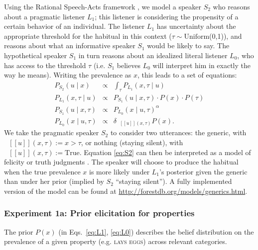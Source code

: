 \documentclass[11pt,letterpaper]{article}
\newcommand{\denote}[1]{\mbox{ $[\![ #1 ]\!]$}}
\begin{document}
Using the Rational Speech-Acts framework \cite{Frank2012,Goodman2013}, 
we model a speaker $S_2$ who reasons about a pragmatic listener $L_1$; this listener is considering the propensity of a certain behavior of an individual.
The listener $L_1$ has uncertainty about the appropriate threshold for the habitual in this context ($\tau \sim \text{Uniform}$(0,1)), and reasons about what an informative speaker $S_1$ would be likely to say. The hypothetical speaker $S_1$ in turn reasons about an idealized literal listener $L_0$, who has access to the threshold $\tau$ (i.e. $S_1$ believes $L_0$ will interpret him in exactly the way he means). 
Writing the prevalence as $x$, this leads to a set of equations:
\begin{eqnarray}
P_{S_{2}}(u \mid x) & \propto &  \int_{\tau} P_{L_{1}}(x , \tau \mid u) \label{eq:S2}\\
P_{L_{1}}(x , \tau \mid u) &\propto& P_{S_{1}}(u \mid x, \tau) \cdot P(x) \cdot P(\tau) \label{eq:L1}\\
P_{S_{1}}(u \mid x, \tau) &\propto&  {P_{L_{0}}(x \mid u, \tau)}^{\alpha} \label{eq:S1}\\
P_{L_{0}}(x \mid u, \tau) &\propto& {\delta_{\denote{u}(x, \tau)} P(x)}. \label{eq:L0}
\end{eqnarray}
We take the pragmatic speaker $S_2$ to consider two utterances: the generic, with $\denote{u}(x, \tau) := x>\tau$, or nothing (staying silent), with $\denote{u}(x, \tau) := \text{True}$.
Equation \ref{eq:S2} can then be interpreted as a model of felicity or truth judgments \cite{Degen2014, TesslerUnderReview}.
The speaker will choose to produce the habitual when the true prevalence $x$ is more likely under $L_1$'s posterior given the generic than under her prior (implied by $S_2$ ``staying silent''). 
A fully implemented version of the model can be found at \url{http://forestdb.org/models/generics.html}.

\subsubsection*{Experiment 1a: Prior elicitation for properties}

The prior $P(x)$ (in Eqs.~\ref{eq:L1}, \ref{eq:L0}) describes the belief distribution on the prevalence of a given property (e.g. \textsc{lays eggs}) across relevant categories. 
 
\end{document}
